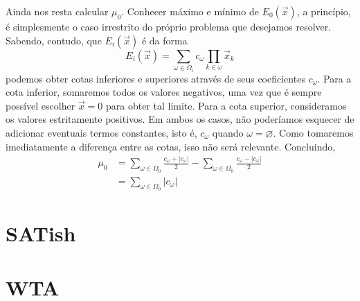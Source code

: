 Ainda nos resta calcular $\mu_0$. Conhecer máximo e mínimo de $E_0 \left({\vec{x}}\right)$, a princípio, é simplesmente o caso irrestrito do próprio problema que desejamos resolver. Sabendo, contudo, que $E_{i} \left({\vec{x}}\right)$ é da forma
\begin{equation}
    E_{i} \left({\vec{x}}\right) = \sum_{\omega \in \Omega_{i}} c_{\omega} \prod_{k \in \omega} \vec{x}_{k}
\end{equation}
podemos obter cotas inferiores e superiores através de seus coeficientes $c_\omega$. Para a cota inferior, somaremos todos os valores negativos, uma vez que é sempre possível escolher $\vec{x} = 0$ para obter tal limite. Para a cota superior, consideramos os valores estritamente positivos. Em ambos os casos, não poderíamos esquecer de adicionar eventuais termos constantes, isto é, $c_\omega$ quando $\omega = \varnothing$. Como tomaremos imediatamente a diferença entre as cotas, isso não será relevante. Concluindo,
\begin{align}
    \mu_0 &= \sum_{\omega \in \Omega_0} \frac{c_\omega + \left|c_\omega\right|}{2} - \sum_{\omega \in \Omega_0} \frac{c_\omega - \left|c_\omega\right|}{2} \nonumber \\
    &= \sum_{\omega \in \Omega_0} \left|c_\omega\right|
\end{align}

\section{SATish}

\section{WTA}


